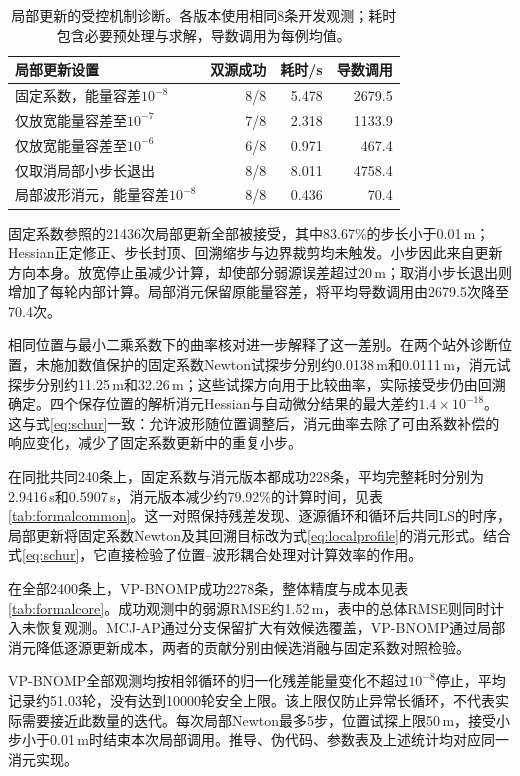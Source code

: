 \documentclass[a4paper,fleqn]{cas-sc}
\numberwithin{equation}{section}
\numberwithin{figure}{section}
\numberwithin{table}{section}
\begin{document}
\begin{table}[pos=H]\centering\small
\caption{局部更新的受控机制诊断。各版本使用相同8条开发观测；耗时包含必要预处理与求解，导数调用为每例均值。}\label{tab:mechanism}
\begin{tabular}{@{}lrrr@{}}\toprule
局部更新设置 & 双源成功 & 耗时/s & 导数调用\\\midrule
固定系数，能量容差$10^{-8}$ & 8/8 & 5.478 & 2679.5\\
仅放宽能量容差至$10^{-7}$ & 7/8 & 2.318 & 1133.9\\
仅放宽能量容差至$10^{-6}$ & 6/8 & 0.971 & 467.4\\
仅取消局部小步长退出 & 8/8 & 8.011 & 4758.4\\
局部波形消元，能量容差$10^{-8}$ & 8/8 & 0.436 & 70.4\\\bottomrule
\end{tabular}\end{table}

固定系数参照的21436次局部更新全部被接受，其中83.67\%的步长小于0.01\,m；Hessian正定修正、步长封顶、回溯缩步与边界裁剪均未触发。小步因此来自更新方向本身。放宽停止虽减少计算，却使部分弱源误差超过20\,m；取消小步长退出则增加了每轮内部计算。局部消元保留原能量容差，将平均导数调用由2679.5次降至70.4次。

相同位置与最小二乘系数下的曲率核对进一步解释了这一差别。在两个站外诊断位置，未施加数值保护的固定系数Newton试探步分别约0.0138\,m和0.0111\,m，消元试探步分别约11.25\,m和32.26\,m；这些试探方向用于比较曲率，实际接受步仍由回溯确定。四个保存位置的解析消元Hessian与自动微分结果的最大差约$1.4\times10^{-18}$。这与式\eqref{eq:schur}一致：允许波形随位置调整后，消元曲率去除了可由系数补偿的响应变化，减少了固定系数更新中的重复小步。

在同批共同240条上，固定系数与消元版本都成功228条，平均完整耗时分别为2.9416\,s和0.5907\,s，消元版本减少约79.92\%的计算时间，见表\ref{tab:formalcommon}。这一对照保持残差发现、逐源循环和循环后共同LS的时序，局部更新将固定系数Newton及其回溯目标改为式\eqref{eq:localprofile}的消元形式。结合式\eqref{eq:schur}，它直接检验了位置--波形耦合处理对计算效率的作用。

在全部2400条上，VP-BNOMP成功2278条，整体精度与成本见表\ref{tab:formalcore}。成功观测中的弱源RMSE约1.52\,m，表中的总体RMSE则同时计入未恢复观测。MCJ-AP通过分支保留扩大有效候选覆盖，VP-BNOMP通过局部消元降低逐源更新成本，两者的贡献分别由候选消融与固定系数对照检验。

VP-BNOMP全部观测均按相邻循环的归一化残差能量变化不超过$10^{-8}$停止，平均记录约51.03轮，没有达到10000轮安全上限。该上限仅防止异常长循环，不代表实际需要接近此数量的迭代。每次局部Newton最多5步，位置试探上限50\,m，接受小步小于0.01\,m时结束本次局部调用。推导、伪代码、参数表及上述统计均对应同一消元实现。
\end{document}
